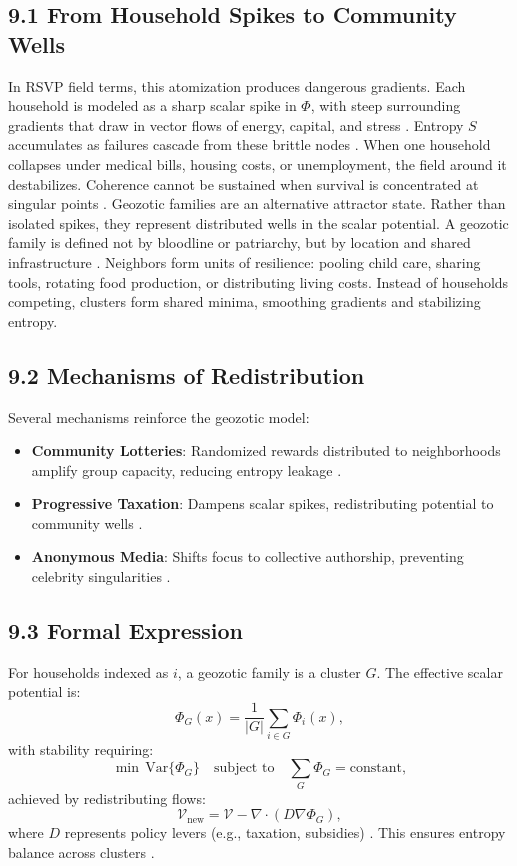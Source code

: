 \documentclass[12pt]{article}
\begin{document}
\subsection*{9.1 From Household Spikes to Community Wells}
In RSVP field terms, this atomization produces dangerous gradients. Each household is modeled as a sharp scalar spike in \(\Phi\), with steep surrounding gradients that draw in vector flows of energy, capital, and stress \citep{gromov1999}. Entropy \(S\) accumulates as failures cascade from these brittle nodes \citep{shannon1948}. When one household collapses under medical bills, housing costs, or unemployment, the field around it destabilizes. Coherence cannot be sustained when survival is concentrated at singular points \citep{jaynes2003}.
Geozotic families are an alternative attractor state. Rather than isolated spikes, they represent distributed wells in the scalar potential. A geozotic family is defined not by bloodline or patriarchy, but by location and shared infrastructure \citep{deleuze1987}. Neighbors form units of resilience: pooling child care, sharing tools, rotating food production, or distributing living costs. Instead of households competing, clusters form shared minima, smoothing gradients and stabilizing entropy.

\subsection*{9.2 Mechanisms of Redistribution}
Several mechanisms reinforce the geozotic model:
\begin{itemize}
    \item \textbf{Community Lotteries}: Randomized rewards distributed to neighborhoods amplify group capacity, reducing entropy leakage \citep{hanson2003}.
    \item \textbf{Progressive Taxation}: Dampens scalar spikes, redistributing potential to community wells \citep{zuboff2019}.
    \item \textbf{Anonymous Media}: Shifts focus to collective authorship, preventing celebrity singularities \citep{lanier2018}.
\end{itemize}

\subsection*{9.3 Formal Expression}
For households indexed as \(i\), a geozotic family is a cluster \(G\). The effective scalar potential is:
\[
\Phi_G(x) = \frac{1}{|G|} \sum_{i \in G} \Phi_i(x),
\]
with stability requiring:
\[
\min \, \mathrm{Var}\{\Phi_G\} \quad \text{subject to} \quad \sum_G \Phi_G = \text{constant},
\]
achieved by redistributing flows:
\[
\mathcal{V}_{\text{new}} = \mathcal{V} - \nabla \cdot (D \nabla \Phi_G),
\]
where \(D\) represents policy levers (e.g., taxation, subsidies) \citep{gromov1999}. This ensures entropy balance across clusters \citep{cover2006}.
\end{document}
